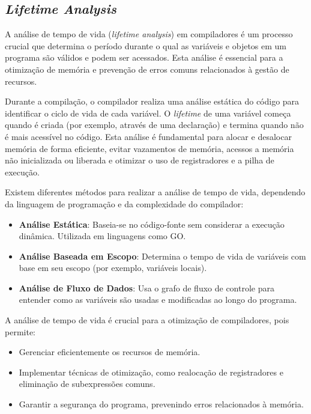 \documentclass{article}
\begin{document}
    \subsection*{\emph{Lifetime Analysis}}

    A análise de tempo de vida (\textit{lifetime analysis}) em compiladores é um processo crucial que determina o
    período durante o qual as variáveis e objetos em um programa são válidos e podem ser acessados. Esta análise é
    essencial para a otimização de memória e prevenção de erros comuns relacionados à gestão de recursos.

    Durante a compilação, o compilador realiza uma análise estática do código para identificar o ciclo de vida
    de cada variável. O \textit{lifetime} de uma variável começa quando é criada (por exemplo, através de uma declaração)
    e termina quando não é mais acessível no código. Esta análise é fundamental para
    alocar e desalocar memória de forma eficiente, evitar vazamentos de memória, acessos a memória não
    inicializada ou liberada e otimizar o uso de registradores e a pilha de execução.

    Existem diferentes métodos para realizar a análise de tempo de vida, dependendo da linguagem de programação e da complexidade do compilador:

    \begin{itemize}
        \item \textbf{Análise Estática}: Baseia-se no código-fonte sem considerar a execução dinâmica.
        Utilizada em linguagens como GO.

        \item \textbf{Análise Baseada em Escopo}: Determina o tempo de vida de variáveis com base em
        seu escopo (por exemplo, variáveis locais).

        \item \textbf{Análise de Fluxo de Dados}: Usa o grafo de fluxo de controle para entender
        como as variáveis são usadas e modificadas ao longo do programa.
    \end{itemize}

    A análise de tempo de vida é crucial para a otimização de compiladores, pois permite:

    \begin{itemize}
        \item Gerenciar eficientemente os recursos de memória.

        \item Implementar técnicas de otimização, como realocação de registradores e eliminação de subexpressões comuns.

        \item Garantir a segurança do programa, prevenindo erros relacionados à memória.
    \end{itemize}
\end{document}
